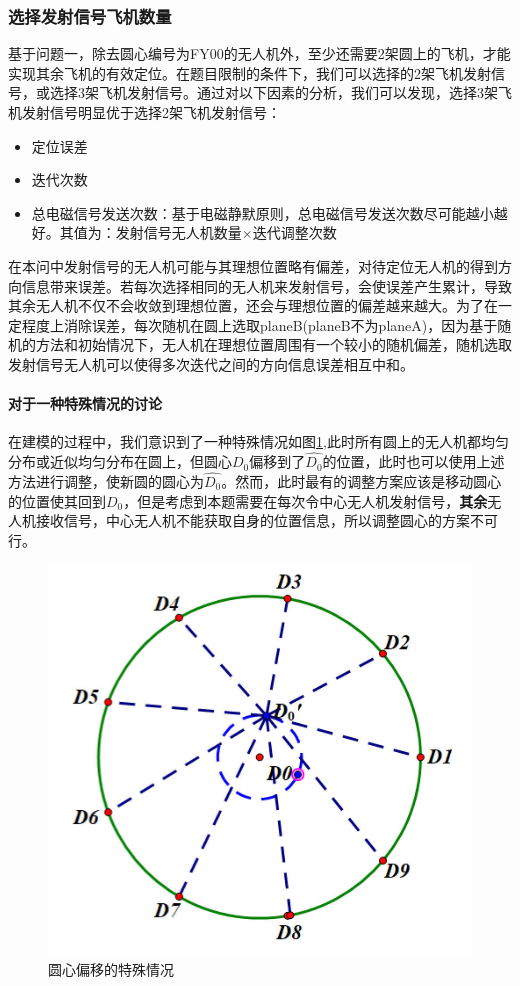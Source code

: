 \documentclass[withoutpreface,bwprint]{cumcmthesis} %
\begin{document}
			\subsubsection{选择发射信号飞机数量}
			基于问题一，除去圆心编号为FY00的无人机外，至少还需要2架圆上的飞机，才能实现其余飞机的有效定位。在题目限制的条件下，我们可以选择的2架飞机发射信号，或选择3架飞机发射信号。通过对以下因素的分析，我们可以发现，选择3架飞机发射信号明显优于选择2架飞机发射信号：
			\begin{itemize}
				\item 定位误差
				\item 迭代次数
				\item 总电磁信号发送次数：基于电磁静默原则，总电磁信号发送次数尽可能越小越好。其值为：发射信号无人机数量$\times$迭代调整次数
			\end{itemize}
			在本问中发射信号的无人机可能与其理想位置略有偏差，对待定位无人机的得到方向信息带来误差。若每次选择相同的无人机来发射信号，会使误差产生累计，导致其余无人机不仅不会收敛到理想位置，还会与理想位置的偏差越来越大。为了在一定程度上消除误差，每次随机在圆上选取planeB(planeB不为planeA)，因为基于随机的方法和初始情况下，无人机在理想位置周围有一个较小的随机偏差，随机选取发射信号无人机可以使得多次迭代之间的方向信息误差相互中和。
			
		
			
			
			
			\paragraph{对于一种特殊情况的讨论}
			在建模的过程中，我们意识到了一种特殊情况如图\ref{fig17},此时所有圆上的无人机都均匀分布或近似均匀分布在圆上，但圆心$D_0$偏移到了$\widehat{D_0}$的位置，此时也可以使用上述方法进行调整，使新圆的圆心为$\widehat{D_0}$。然而，此时最有的调整方案应该是移动圆心的位置使其回到$D_0$，但是考虑到本题需要在每次令中心无人机发射信号，\textbf{其余}无人机接收信号，中心无人机不能获取自身的位置信息，所以调整圆心的方案不可行。
			\begin{figure}[H]
				\centering
				\includegraphics[width=0.45\linewidth]{./figures/17}
				\caption{圆心偏移的特殊情况}
				\label{fig17}
			\end{figure}
			
\end{document}
